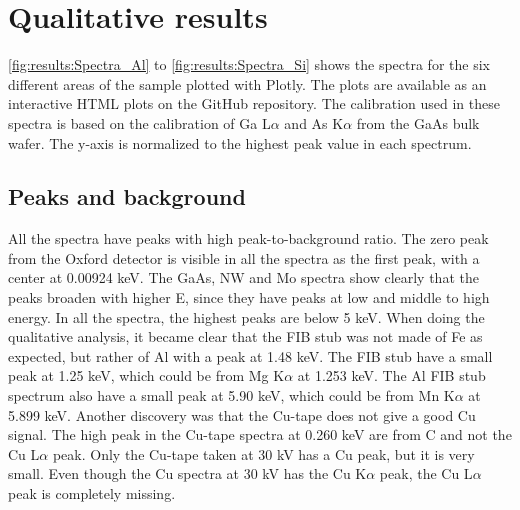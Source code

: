 \section{Qualitative results}
\label{sec:results:qualitative}

\cref{fig:results:Spectra_Al} to \cref{fig:results:Spectra_Si} shows the spectra for the six different areas of the sample plotted with Plotly.
The plots are available as an interactive HTML plots on the GitHub repository.
The calibration used in these spectra is based on the calibration of Ga L$\alpha$ and As K$\alpha$ from the GaAs bulk wafer.
The y-axis is normalized to the highest peak value in each spectrum.





\subsection{Peaks and background}
\label{sec:results:qualitative:peaks}

All the spectra have peaks with high peak-to-background ratio.
The zero peak from the Oxford detector is visible in all the spectra as the first peak, with a center at 0.00924 keV.
The GaAs, NW and Mo spectra show clearly that the peaks broaden with higher E, since they have peaks at low and middle to high energy.
In all the spectra, the highest peaks are below 5 keV. %
When doing the qualitative analysis, it became clear that the FIB stub was not made of Fe as expected, but rather of Al with a peak at 1.48 keV.
The FIB stub have a small peak at 1.25 keV, which could be from Mg K$\alpha$ at 1.253 keV.
The Al FIB stub spectrum also have a small peak at 5.90 keV, which could be from Mn K$\alpha$ at 5.899 keV.
Another discovery was that the Cu-tape does not give a good Cu signal.
The high peak in the Cu-tape spectra at 0.260 keV are from C and not the Cu L$\alpha$ peak.
Only the Cu-tape taken at 30 kV has a Cu peak, but it is very small.
Even though the Cu spectra at 30 kV has the Cu K$\alpha$ peak, the Cu L$\alpha$ peak is completely missing. %


